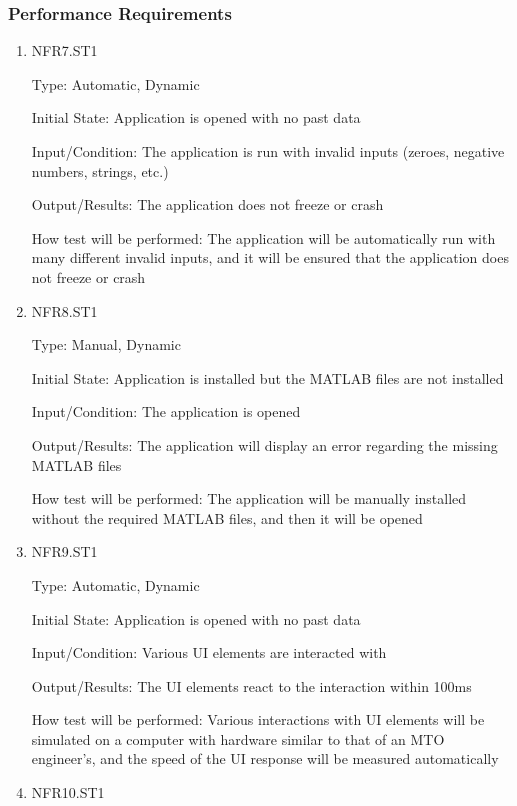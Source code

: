 \documentclass[12pt, titlepage]{article}
\begin{document}
\subsubsection{Performance Requirements}

\begin{enumerate}

\item{NFR7.ST1\\}

Type: Automatic, Dynamic

Initial State: Application is opened with no past data

Input/Condition: The application is run with invalid inputs (zeroes, negative numbers, strings, etc.)

Output/Results: The application does not freeze or crash

How test will be performed: The application will be automatically run with many different invalid inputs, and it will be ensured that the application does not freeze or crash

\item{NFR8.ST1\\}

Type: Manual, Dynamic

Initial State: Application is installed but the MATLAB files are not installed

Input/Condition: The application is opened

Output/Results: The application will display an error regarding the missing MATLAB files

How test will be performed: The application will be manually installed without the required MATLAB files, and then it will be opened

\item{NFR9.ST1\\}

Type: Automatic, Dynamic

Initial State: Application is opened with no past data

Input/Condition: Various UI elements are interacted with

Output/Results: The UI elements react to the interaction within 100ms

How test will be performed: Various interactions with UI elements will be simulated on a computer with hardware similar to that of an MTO engineer's, and the speed of the UI response will be measured automatically

\item{NFR10.ST1\\}


\end{enumerate}
\end{document}
